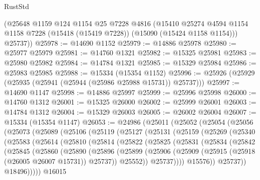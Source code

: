 \begin{lexlean}{RustStd}
\begin{coremodule}
      (@25648
        @1159
        @124
        @1154
        @25
        @7228
        @4816
        (@15410
          @25274
          @4594
          @1154
          @1158
          @7228
          (@15418 (@15419 @7228))
          (@15090 (@15424 @1158 @1154)))
        @25737))
@25978 := @14690 @1152
@25979 := @14886 @25978
@25980 := @25977 @25979
@25981 := @14760 @1321
@25982 := @15325 @25981
@25983 := @25980 @25982
@25984 := @14784 @1321
@25985 := @15329 @25984
@25986 := @25983 @25985
@25988 := @15334 (@15354 @1152)
@25996 := @25926 (@25929 (@25935 (@25941 (@25944 (@25986 @25988 @15731)) @25737)))
@25997 := @14690 @1147
@25998 := @14886 @25997
@25999 := @25996 @25998
@26000 := @14760 @1312
@26001 := @15325 @26000
@26002 := @25999 @26001
@26003 := @14784 @1312
@26004 := @15329 @26003
@26005 := @26002 @26004
@26007 := @15334 (@15354 @1147)
@26053 := @24986
    (@25011
      (@25052
        (@25054
          (@25056
            (@25073
              (@25089
                (@25106
                  (@25119
                    (@25127
                      (@25131
                        (@25159
                          (@25269
                            (@25340
                              (@25583
                                (@25614
                                  (@25810
                                    (@25814
                                      (@25822
                                        (@25825
                                          (@25831
                                            (@25834
                                              (@25842
                                                (@25845
                                                  (@25860
                                                    (@25890
                                                      (@25896
                                                        (@25899
                                                          (@25906
                                                            (@25909
                                                              (@25915
                                                                (@25918 (@26005 @26007 @15731))
                                                                @25737))
                                                            @25552))
                                                        @25737))))
                                                @15576))
                                            @25737))
                                        @18496)))))
                              @16015

\end{coremodule}
\end{lexlean}
